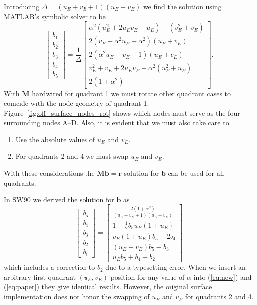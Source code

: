 \documentclass[12pt,letterpaper,margin=0.5in]{article}
\begin{document}
Introducing $\Delta = \left (u_E + v_E + 1 \right)\left (u_E + v_E\right)$ we find
the solution using MATLAB's symbolic solver to be
\begin{equation}
\left[ {\begin{array}{*{20}{c}}
{{b_1}}\\
{{b_2}}\\
{{b_3}}\\
{{b_4}}\\
{{b_5}}
\end{array}} \right] = \frac{1}{\Delta }\left[ {\begin{array}{*{20}{c}}
{\alpha^2(u_E^2 + 2{u_E}{v_E} + {u_E}) - (v_E^2 + {v_E})}\\[4pt]
{2\left( {{v_E} - \alpha^2{u_E} + \alpha^2} \right)\left( {{u_E} + {v_E}} \right)}\\[4pt]
{2\left( {\alpha^2{u_E} - {v_E} + 1} \right)\left( {{u_E} + {v_E}} \right)}\\[4pt]
{v_E^2 + {v_E} + 2{u_E}{v_E} - \alpha^2(u_E^2 + {u_E})}\\[4pt]
2(1+\alpha^2)
\end{array}} \right].
\label{eq:new}
\end{equation}
With $\mathbf{M}$ hardwired for quadrant 1 we must rotate other quadrant cases to coincide with the
node geometry of quadrant 1.  Figure~\ref{fig:off_surface_nodes_rot} shows which nodes must serve as
the four surrounding nodes A--D.  Also, it is evident that we must also take care to
\begin{enumerate}
	\item Use the absolute values of $u_E$ and $v_E$.
	\item For quadrants 2 and 4 we must swap $u_E$ and $v_E$.
\end{enumerate}
With these considerations the $\mathbf{Mb = r}$ solution for $\mathbf{b}$ can be used for all quadrants.

In SW90 we derived the solution for $\mathbf{b}$ as
\begin{equation}
\left[ {\begin{array}{*{20}{c}}
{{b_5}}\\
{{b_4}}\\
{{b_3}}\\
{{b_2}}\\
{{b_1}}
\end{array}} \right] = \left[ {\begin{array}{*{20}{c}}
{\frac{2(1+\alpha^2)}{\left (u_E + v_E + 1 \right)\left (u_E + v_E\right)}}\\[4pt]
{1 - \frac{1}{2}b_5u_E\left(1+u_E\right)}\\[4pt]
{v_E \left(1+u_E\right)b_5 - 2b_4}\\[4pt]
{\left(u_E+v_E\right)b_5 - b_3}\\[4pt]
{u_Eb_5 + b_4 - b_2}
\end{array}} \right]
\label{eq:paper}
\end{equation}
which includes a correction to $b_2$ due to a typesetting error.  When we insert an arbitrary first-quadrant
$(u_E, v_E)$ position for any value of $\alpha$ into (\ref{eq:new}) and (\ref{eq:paper}) they give identical results.
However, the original surface implementation does not honor the swapping of $u_E$ and $v_E$ for quadrants
2 and 4.
\end{document}
